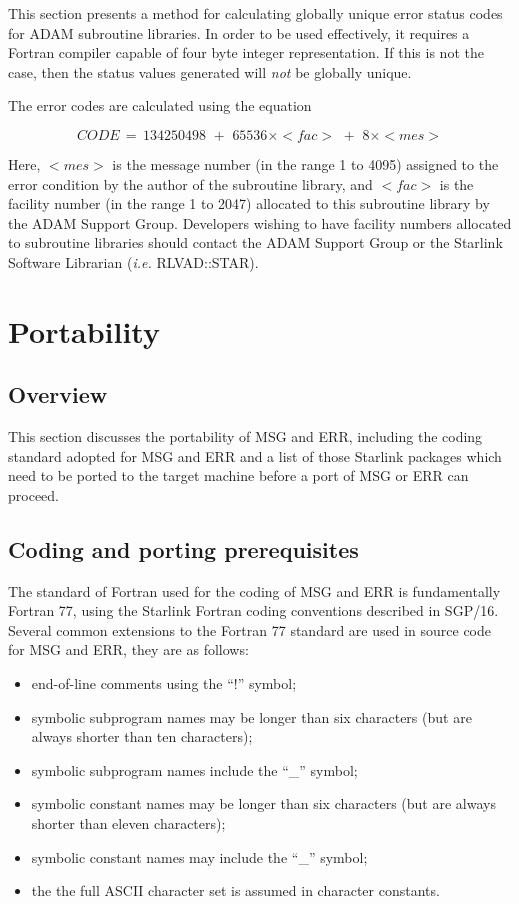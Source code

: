 This section presents a method for calculating globally unique error status
codes for ADAM subroutine libraries.
In order to be used effectively, it requires a Fortran compiler capable of four
byte integer representation.
If this is not the case, then the status values generated will {\em not} be
globally unique.

The error codes are calculated using the equation

\begin {equation}
CODE \,= \, 134250498 \,\, + \,\, 65536\times <fac> \,\, + \,\,  8\times <mes> 
\end {equation}

Here, $<mes>$ is the message number (in the range 1 to 4095) assigned to the
error condition by the author of the subroutine library, and $<fac>$ is the
facility number (in the range 1 to 2047) allocated to this subroutine library
by the ADAM Support Group.
Developers wishing to have facility numbers allocated to subroutine libraries 
should contact the ADAM Support Group or the Starlink Software Librarian
({\em i.e.} RLVAD::STAR).

\section {Portability}

\subsection {Overview}

This section discusses the portability of MSG and ERR, including the coding 
standard adopted for MSG and ERR and a list of those Starlink packages which 
need to be ported to the target machine before a port of MSG or ERR can proceed.


\subsection {Coding and porting prerequisites}

The standard of Fortran used for the coding of MSG and ERR is fundamentally
Fortran 77, using the Starlink Fortran coding conventions described in SGP/16.
Several common extensions to the Fortran 77 standard are used in source 
code for MSG and ERR, they are as follows:

\begin {itemize}
\item end-of-line comments using the ``!'' symbol;
\item symbolic subprogram names may be longer than six characters (but are 
always shorter than ten characters);
\item symbolic subprogram names include the ``\_'' symbol;
\item symbolic constant names may be longer than six characters (but are always
shorter than eleven characters);
\item symbolic constant names may include the ``\_'' symbol;
\item the the full ASCII character set is assumed in character constants.
\end {itemize}

